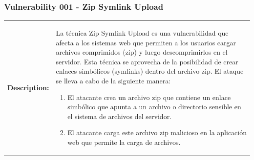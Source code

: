 \documentclass[a4paper]{article} %
\begin{document}
    \subsubsection{\textbf{Vulnerability 001 - Zip Symlink Upload}}
    \begin{table}[htbp]
        \begin{tabularx}{\textwidth}{|c|X|}
            \hline
            \cellcolor{lightgray}\textbf{Description:} & 
            {
                La técnica Zip Symlink Upload es una vulnerabilidad que afecta a los sistemas web que permiten a los usuarios cargar archivos comprimidos (zip) y luego descomprimirlos en el servidor. Esta técnica se aprovecha de la posibilidad de crear enlaces simbólicos (symlinks) dentro del archivo zip. \newline\newline
                \vspace{0.3cm}
                El ataque se lleva a cabo de la siguiente manera:
                
                \begin{enumerate}[label=\textit{\arabic*.}]
                \item El atacante crea un archivo zip que contiene un enlace simbólico que apunta a un archivo o directorio sensible en el sistema de archivos del servidor.

                \item El atacante carga este archivo zip malicioso en la aplicación web que permite la carga de archivos.


\end{enumerate}}
\end{tabularx}
\end{table}
\end{document}
